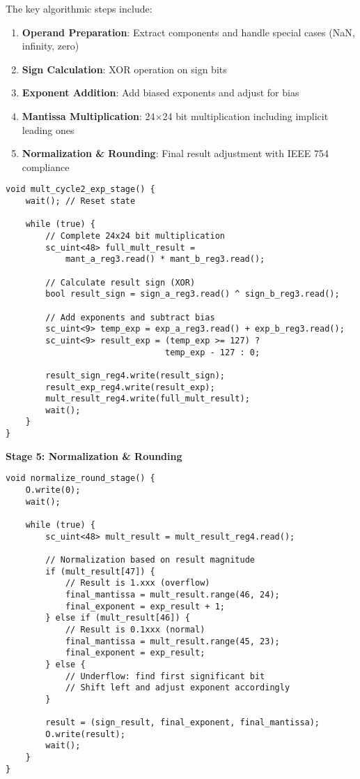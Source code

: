 The key algorithmic steps include:
\begin{enumerate}
    \item \textbf{Operand Preparation}: Extract components and handle special cases (NaN, infinity, zero)
    \item \textbf{Sign Calculation}: XOR operation on sign bits  
    \item \textbf{Exponent Addition}: Add biased exponents and adjust for bias
    \item \textbf{Mantissa Multiplication}: 24×24 bit multiplication including implicit leading ones
    \item \textbf{Normalization \& Rounding}: Final result adjustment with IEEE 754 compliance
\end{enumerate}
\begin{lstlisting}[caption=Multiplication and Exponent Addition]
void mult_cycle2_exp_stage() {
    wait(); // Reset state
    
    while (true) {
        // Complete 24x24 bit multiplication
        sc_uint<48> full_mult_result = 
            mant_a_reg3.read() * mant_b_reg3.read();
        
        // Calculate result sign (XOR)
        bool result_sign = sign_a_reg3.read() ^ sign_b_reg3.read();
        
        // Add exponents and subtract bias
        sc_uint<9> temp_exp = exp_a_reg3.read() + exp_b_reg3.read();
        sc_uint<9> result_exp = (temp_exp >= 127) ? 
                                temp_exp - 127 : 0;
        
        result_sign_reg4.write(result_sign);
        result_exp_reg4.write(result_exp);
        mult_result_reg4.write(full_mult_result);
        wait();
    }
}
\end{lstlisting}

\textbf{Stage 5: Normalization \& Rounding}
\begin{lstlisting}[caption=Multiplication Normalization]
void normalize_round_stage() {
    O.write(0);
    wait();
    
    while (true) {
        sc_uint<48> mult_result = mult_result_reg4.read();
        
        // Normalization based on result magnitude
        if (mult_result[47]) {
            // Result is 1.xxx (overflow)
            final_mantissa = mult_result.range(46, 24);
            final_exponent = exp_result + 1;
        } else if (mult_result[46]) {
            // Result is 0.1xxx (normal)
            final_mantissa = mult_result.range(45, 23);
            final_exponent = exp_result;
        } else {
            // Underflow: find first significant bit
            // Shift left and adjust exponent accordingly
        }
        
        result = (sign_result, final_exponent, final_mantissa);
        O.write(result);
        wait();
    }
}
\end{lstlisting}

